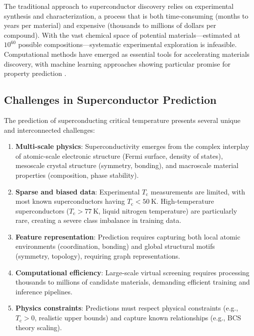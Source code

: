 \documentclass[11pt,a4paper]{article}
\begin{document}
The traditional approach to superconductor discovery relies on experimental synthesis and characterization, a process that is both time-consuming (months to years per material) and expensive (thousands to millions of dollars per compound). With the vast chemical space of potential materials—estimated at $10^{60}$ possible compositions—systematic experimental exploration is infeasible. Computational methods have emerged as essential tools for accelerating materials discovery, with machine learning approaches showing particular promise for property prediction \citep{curtarolo2013aflow}.

\subsection{Challenges in Superconductor Prediction}

The prediction of superconducting critical temperature presents several unique and interconnected challenges:

\begin{enumerate}
    \item \textbf{Multi-scale physics}: Superconductivity emerges from the complex interplay of atomic-scale electronic structure (Fermi surface, density of states), mesoscale crystal structure (symmetry, bonding), and macroscale material properties (composition, phase stability).
    
    \item \textbf{Sparse and biased data}: Experimental $T_{\text{c}}$ measurements are limited, with most known superconductors having $T_{\text{c}} < \SI{50}{\kelvin}$. High-temperature superconductors ($T_{\text{c}} > \SI{77}{\kelvin}$, liquid nitrogen temperature) are particularly rare, creating a severe class imbalance in training data.
    
    \item \textbf{Feature representation}: Prediction requires capturing both local atomic environments (coordination, bonding) and global structural motifs (symmetry, topology), requiring graph representations.
    
    \item \textbf{Computational efficiency}: Large-scale virtual screening requires processing thousands to millions of candidate materials, demanding efficient training and inference pipelines.
    
    \item \textbf{Physics constraints}: Predictions must respect physical constraints (e.g., $T_{\text{c}} > 0$, realistic upper bounds) and capture known relationships (e.g., BCS theory scaling).
\end{enumerate}
\end{document}
